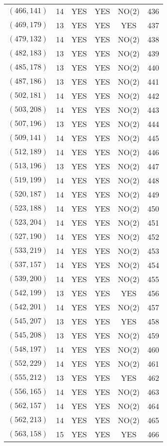 \begin{longtable}{|c|c|c|c|c|c|}
$(466, 141)$ & 14 & YES & YES & NO(2) & 436\\
$(469, 179)$ & 13 & YES & YES & YES & 437\\
$(479, 132)$ & 14 & YES & YES & NO(2) & 438\\
$(482, 183)$ & 13 & YES & YES & NO(2) & 439\\
$(485, 178)$ & 13 & YES & YES & NO(2) & 440\\
$(487, 186)$ & 13 & YES & YES & NO(2) & 441\\
$(502, 181)$ & 14 & YES & YES & NO(2) & 442\\
$(503, 208)$ & 14 & YES & YES & NO(2) & 443\\
$(507, 196)$ & 13 & YES & YES & NO(2) & 444\\
$(509, 141)$ & 14 & YES & YES & NO(2) & 445\\
$(512, 189)$ & 14 & YES & YES & NO(2) & 446\\
$(513, 196)$ & 13 & YES & YES & NO(2) & 447\\
$(519, 199)$ & 14 & YES & YES & NO(2) & 448\\
$(520, 187)$ & 14 & YES & YES & NO(2) & 449\\
$(523, 188)$ & 14 & YES & YES & NO(2) & 450\\
$(523, 204)$ & 14 & YES & YES & NO(2) & 451\\
$(527, 190)$ & 14 & YES & YES & NO(2) & 452\\
$(533, 219)$ & 14 & YES & YES & NO(2) & 453\\
$(537, 157)$ & 14 & YES & YES & NO(2) & 454\\
$(539, 200)$ & 14 & YES & YES & NO(2) & 455\\
$(542, 199)$ & 13 & YES & YES & YES & 456\\
$(542, 201)$ & 14 & YES & YES & NO(2) & 457\\
$(545, 207)$ & 13 & YES & YES & YES & 458\\
$(545, 208)$ & 13 & YES & YES & NO(2) & 459\\
$(548, 197)$ & 14 & YES & YES & NO(2) & 460\\
$(552, 229)$ & 14 & YES & YES & NO(2) & 461\\
$(555, 212)$ & 13 & YES & YES & YES & 462\\
$(556, 165)$ & 14 & YES & YES & NO(2) & 463\\
$(562, 157)$ & 14 & YES & YES & NO(2) & 464\\
$(562, 213)$ & 14 & YES & YES & NO(2) & 465\\
$(563, 158)$ & 15 & YES & YES & YES & 466\\

\end{longtable}
